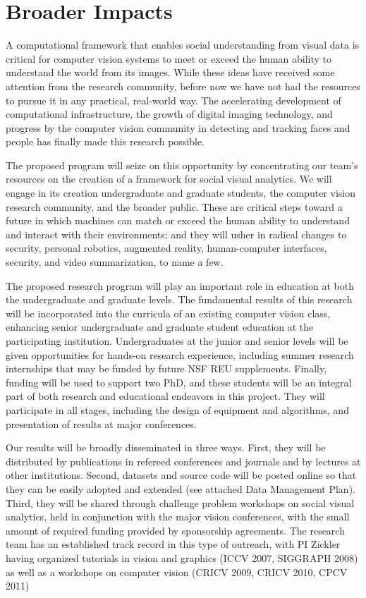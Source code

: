 
\section{Broader Impacts}
\label{sec:impacts}

A computational framework that enables social understanding from visual data is critical for computer vision systems to meet or exceed the human ability to understand the world from its images. While these ideas have received some attention from the research community, before now we have not had the resources to pursue it in any practical, real-world way. The accelerating development of computational infrastructure, the growth of digital imaging technology, and progress by the computer vision community in detecting and tracking faces and people has finally made this research possible. 

The proposed  program will seize on this opportunity by concentrating our team's resources on the creation of a  framework for social visual analytics.  We will engage in its creation undergraduate and graduate students, the computer vision research community, and the broader public. These are critical steps toward a future in which machines can match or exceed the human ability to understand and interact with their environments; and they will usher in radical changes to security, personal robotics, augmented reality, human-computer interfaces, security, and video summarization, to name a few.

The proposed research program will play an important role in education at both the undergraduate and graduate levels. The fundamental results of this research will be incorporated into the curricula of an existing computer vision class, enhancing senior undergraduate and graduate student education at the participating institution. Undergraduates at the junior and senior levels will be given opportunities for hands-on research experience, including summer research internships that may be funded by future NSF REU supplements. Finally, funding will be used to support two PhD, and these students will be an integral part of both research and educational endeavors in this project. They will participate in all stages, including the design of equipment and algorithms, and presentation of results at major conferences.

Our results will be broadly disseminated in three ways. First, they will be distributed by publications in refereed conferences and journals and by lectures at other institutions.  Second, datasets and source code will be posted online so that they can be easily adopted and extended (see attached Data Management Plan). Third, they will be shared through  challenge problem workshops on social visual analytics, held in conjunction with the major  vision conferences, with the small amount of required funding provided by sponsorship agreements. The research team has an established track record in this type of outreach, with PI Zickler having organized tutorials in  vision and  graphics (ICCV 2007, SIGGRAPH 2008) as well as a workshops on computer vision (CRICV 2009, CRICV 2010, CPCV 2011)
